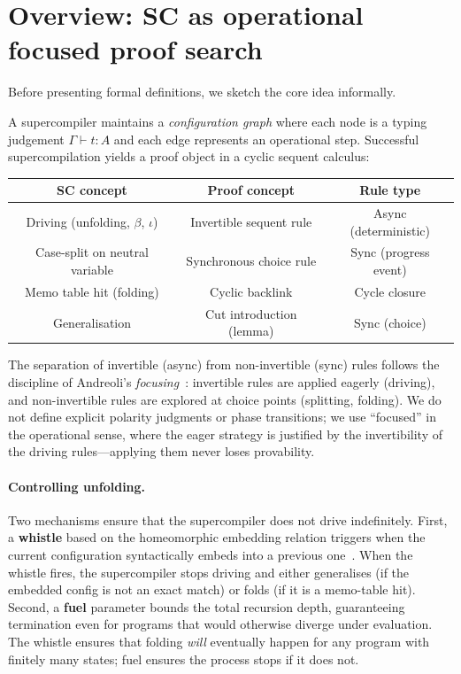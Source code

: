 \section{Overview: SC as operational focused proof search}
\label{sec:overview}

Before presenting formal definitions, we sketch the core idea informally.

A supercompiler maintains a \emph{configuration graph} where each node is a typing judgement $\Gamma \vdash t : A$ and each edge represents an operational step. Successful supercompilation yields a proof object in a cyclic sequent calculus:

\begin{center}
\small
\begin{tabular}{c|c|c}
\textbf{SC concept} & \textbf{Proof concept} & \textbf{Rule type} \\
\hline
Driving (unfolding, $\beta$, $\iota$) & Invertible sequent rule & Async (deterministic) \\
Case-split on neutral variable & Synchronous choice rule & Sync (progress event) \\
Memo table hit (folding) & Cyclic backlink & Cycle closure \\
Generalisation & Cut introduction (lemma) & Sync (choice) \\
\end{tabular}
\end{center}

The separation of invertible (async) from non-invertible (sync) rules follows the discipline of Andreoli's \emph{focusing}~\cite{andreoli-1992-logic-programming}: invertible rules are applied eagerly (driving), and non-invertible rules are explored at choice points (splitting, folding). We do not define explicit polarity judgments or phase transitions; we use ``focused'' in the operational sense, where the eager strategy is justified by the invertibility of the driving rules---applying them never loses provability.

\paragraph{Controlling unfolding.}
Two mechanisms ensure that the supercompiler does not drive indefinitely.
First, a \textbf{whistle} based on the homeomorphic embedding relation
triggers when the current configuration syntactically embeds into a
previous one~\cite{leuschel-2002-homeomorphic,sorensen-gluck-jones-1996-positive}.
When the whistle fires, the supercompiler stops driving and either
generalises (if the embedded config is not an exact match) or folds (if
it is a memo-table hit).  Second, a \textbf{fuel} parameter bounds the
total recursion depth, guaranteeing termination even for programs that
would otherwise diverge under evaluation.  The whistle ensures that
folding \emph{will} eventually happen for any program with finitely many
states; fuel ensures the process stops if it does not.


